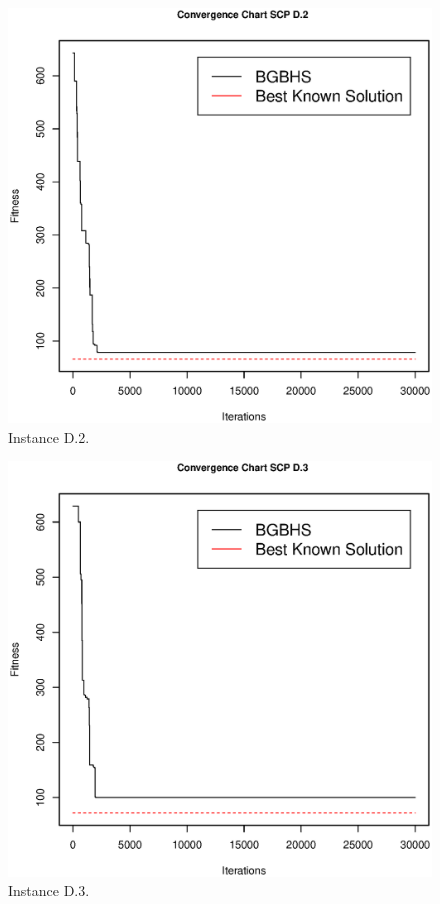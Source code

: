 \begin{figure}[]
\centering
\includegraphics[scale=.45]{Resultados/scpD2.eps}
\caption{Instance D.2.}
\label{fig:Instance.D.2}
\end{figure}

\begin{figure}[]
\centering
\includegraphics[scale=.45]{Resultados/scpD3.eps}
\caption{Instance D.3.}
\label{fig:Instance.D.3}
\end{figure}

